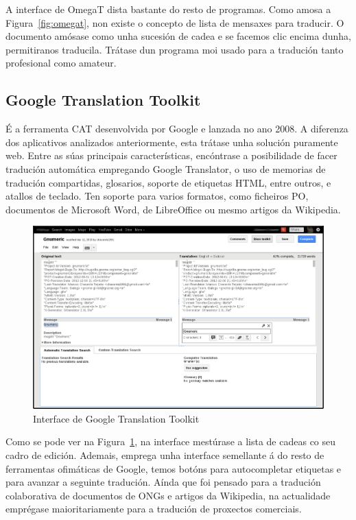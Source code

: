 A interface de OmegaT dista bastante do resto de programas. Como amosa a Figura~\ref{fig:omegat}, non existe o concepto de lista de mensaxes para traducir. O documento amósase como unha sucesión de cadea e se facemos clic encima dunha, permitiranos traducila. Trátase dun programa moi usado para a tradución tanto profesional como amateur.

\subsection{Google Translation Toolkit}
É a ferramenta CAT desenvolvida por Google e lanzada no ano 2008. A diferenza dos aplicativos analizados anteriormente, esta trátase unha solución puramente web. Entre as súas principais características, encóntrase a posibilidade de facer tradución automática empregando Google Translator, o uso de memorias de tradución compartidas, glosarios, soporte de etiquetas HTML, entre outros, e atallos de teclado. Ten soporte para varios formatos, como ficheiros PO, documentos de Microsoft Word, de LibreOffice ou mesmo artigos da Wikipedia.

\begin{figure}[h]
    \centering
    \includegraphics[width=\textwidth]{img/captura_googletranslationtoolkit.png}
    \caption{Interface de Google Translation Toolkit}
    \label{fig:translatetoolkit}
\end{figure}

Como se pode ver na Figura~\ref{fig:translatetoolkit}, na interface mestúrase a lista de cadeas co seu cadro de edición. Ademais, emprega unha interface semellante á do resto de ferramentas ofimáticas de Google, temos botóns para autocompletar etiquetas e para avanzar a seguinte tradución. Aínda que foi pensado para a tradución colaborativa de documentos de ONGs e artigos da Wikipedia, na actualidade emprégase maioritariamente para a tradución de proxectos comerciais.


